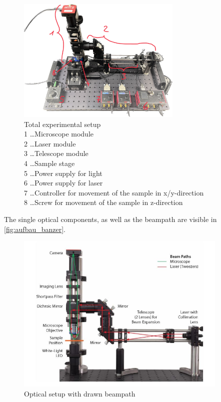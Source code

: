 \documentclass[12pt,english,ngerman]{scrartcl}
\begin{document}
\begin{figure}[H]
	\begin{center}
		\includegraphics[width =0.7\textwidth]{./figures/aufbau.jpg}
	\end{center}
	\caption[Total experimental setup] {
		Total experimental setup \\
		1 \dots Microscope module               \\
		2 \dots Laser module                                                 \\
		3 \dots Telescope module \\
		4 \dots Sample stage \\
		5 \dots Power supply for light\\
		6 \dots Power supply for laser\\
		7 \dots Controller for movement of the sample in x/y-direction\\
		8 \dots Screw for movement of the sample in z-direction
	}\label{fig:aufbau}
\end{figure}

The single optical components, as well as the beampath are visible in \autoref{fig:aufbau_banzer}.

\begin{figure}[H]
	\begin{center}
		\includegraphics[width =0.9\textwidth]{./figures/aufbau_banzer.JPG}
	\end{center}
	\caption[Optical setup] {
		Optical setup with drawn beampath %
	}\label{fig:aufbau_banzer}
\end{figure}
\end{document}
